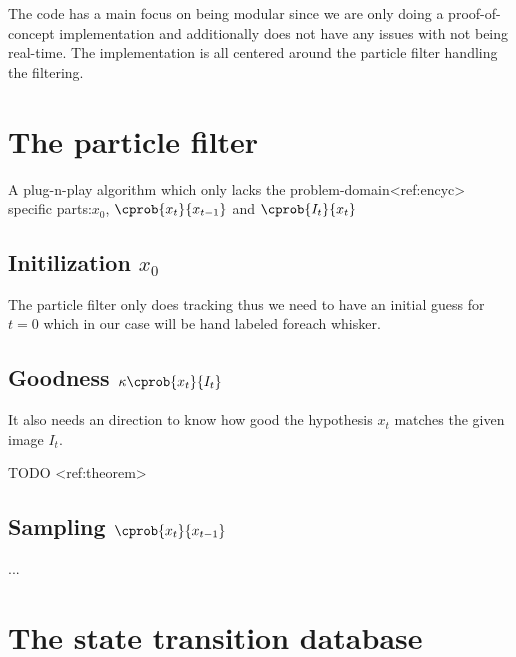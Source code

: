 
The code has a main focus on being modular since we are only doing a proof-of-concept implementation and additionally does not have any issues with not being real-time.
The implementation is all centered around the particle filter handling the filtering.

\section{The particle filter}
    A plug-n-play algorithm which only lacks the problem-domain<ref:encyc> specific parts:$x_0$, $\cprob{x_t}{x_{t-1}}$ and $\cprob{I_t}{x_t}$
    \subsection{Initilization $x_0$}
        The particle filter only does tracking thus we need to have an initial guess for $t=0$ which in our case will be hand labeled foreach whisker.
    \subsection{Goodness $\kappa\cprob{x_t}{I_t}$}
        It also needs an direction to know how good the hypothesis $x_t$ matches the given image $I_t$.

        TODO <ref:theorem>
    \subsection{Sampling $\cprob{x_t}{x_{t-1}}$}

        ...

\section{The state transition database}

